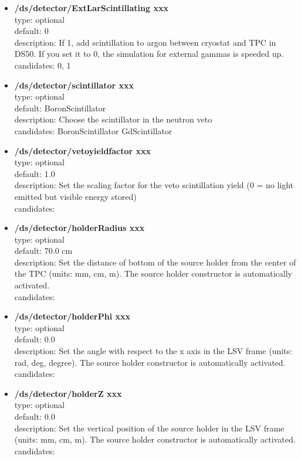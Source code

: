 \documentclass[twocolumn, 10pt]{article}
\begin{document}
\begin{itemize}
\item \textbf{/ds/detector/ExtLarScintillating xxx}\\
type: optional \\
default: 0 \\
description: If 1, add  scintillation to argon between cryostat and TPC in DS50. If you set it to 0, the simulation for external gammas is speeded up. 
candidates: 0, 1 \\


\item \textbf{/ds/detector/scintillator xxx}\\
type: optional \\
default: BoronScintillator \\
description: Choose the scintillator in the neutron veto\\
candidates: BoronScintillator GdScintillator\\

\item \textbf{/ds/detector/vetoyieldfactor xxx}\\
type: optional \\
default: 1.0 \\
description: Set the scaling factor for the veto scintillation yield (0 = no light emitted but visible energy stored) \\
candidates: \\

\item \textbf{/ds/detector/holderRadius xxx}\\
type: optional \\
default: 70.0 cm \\
description: Set the distance of bottom of the source holder from the center of the TPC (units: mm, cm, m). The source holder constructor is automatically activated.\\
candidates: \\

\item \textbf{/ds/detector/holderPhi xxx}\\
type: optional \\
default: 0.0 \\
description: Set the angle with respect to the x axis in the LSV frame (units: rad, deg, degree).  The source holder constructor is automatically activated.\\
candidates: \\

\item \textbf{/ds/detector/holderZ xxx}\\
type: optional \\
default: 0.0 \\
description: Set the vertical position of the source holder in the LSV frame (units: mm, cm, m).  The source holder constructor is automatically activated. \\
candidates: \\
\end{itemize}
 
\end{document}
